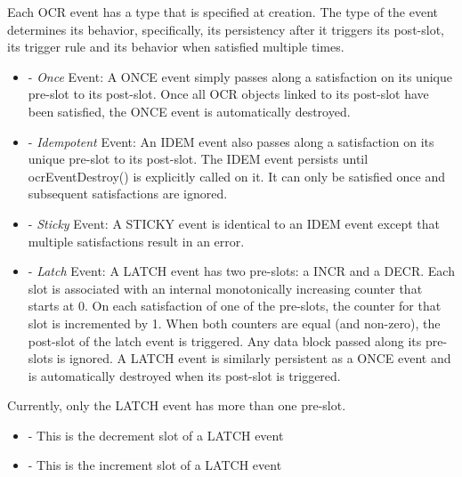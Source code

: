 Each OCR event has a type that is specified at creation.
The type of the event determines its behavior, specifically,
its persistency after it triggers its post-slot, its trigger rule and
its behavior when satisfied multiple times.

\begin{itemize}
\item {} - \emph{Once} Event: A ONCE event simply passes along a satisfaction on its
unique pre-slot to its post-slot. Once all OCR objects linked to its post-slot have been satisfied,
the ONCE event is automatically destroyed.
\item {} - \emph{Idempotent} Event: An IDEM event also passes along a satisfaction on its
unique pre-slot to its post-slot. The IDEM event persists until ocrEventDestroy() is explicitly called on it.
It can only be satisfied once and subsequent satisfactions are ignored.
\item {} - \emph{Sticky} Event: A STICKY event is identical to an IDEM event except that
multiple satisfactions result in an error.
\item {} - \emph{Latch} Event: A LATCH event has two pre-slots: a INCR and a DECR.
Each slot is associated with an internal monotonically increasing counter that starts at 0.
On each satisfaction of one of the pre-slots, the counter for that slot is incremented by 1.
When both counters are equal (and non-zero), the post-slot of the latch event is triggered.
Any data block passed along its pre-slots is ignored. A LATCH event is similarly persistent
as a ONCE event and is automatically destroyed when its post-slot is triggered.
\end{itemize}

Currently, only the LATCH event has more than one pre-slot.
\begin{itemize}
\item {} - This is the decrement slot of a LATCH event
\item {} - This is the increment slot of a LATCH event
\end{itemize}

